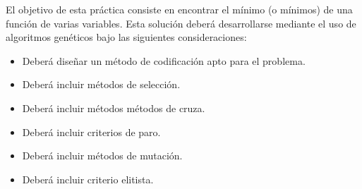 El objetivo de esta práctica consiste en encontrar el mínimo (o mínimos) de una función de varias variables. Esta solución deberá desarrollarse mediante el uso de algoritmos genéticos bajo las siguientes consideraciones:

\begin{itemize}
	\item Deberá diseñar un método de codificación apto para el problema.
	\item Deberá incluir métodos de selección.
	\item Deberá incluir métodos métodos de cruza.
	\item Deberá incluir criterios de paro.
	\item Deberá incluir métodos de mutación.
	\item Deberá incluir criterio elitista.
\end{itemize}
